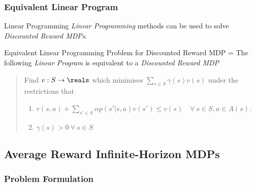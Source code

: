 \documentclass[11pt,a4paper]{article}
\begin{document}
\subsubsection{Equivalent Linear Program}

  \begin{remark}{Linear Programming}
    \textit{Linear Programming} methods can be used to solve \textit{Discounted Reward MDPs}.
  \end{remark}

  \begin{proposition}{Equivalent Linear Programming Problem for Discounted Reward MDP}
    \everymath={\displaystyle}
    The following \textit{Linear Program} is equivalent to a \textit{Discounted Reward MDP}
    \begin{quote}
      Find $v:S\to\reals$ which minimises $\sum_{s\in S}\gamma(s)v(s)$ under the restrictions that
      \begin{enumerate}
        \item $r(s,a)+\sum_{s'\in S}\alpha p(s'|s,a)v(s')\leq v(s)\quad\forall\ s\in S,a\in A(s)$.
        \item $\gamma(s)>0\ \forall\ s\in S$
      \end{enumerate}
    \end{quote}
  \end{proposition}

\subsection{Average Reward Infinite-Horizon MDPs}

\subsubsection{Problem Formulation}
\end{document}
